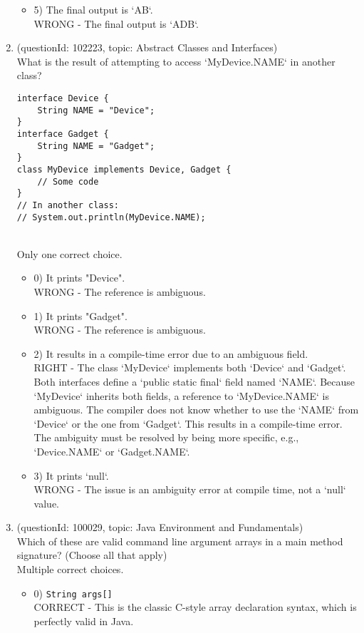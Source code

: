 \documentclass[12pt]{article}
\begin{document}
\begin{enumerate}[label=(\arabic*)]
\begin{itemize}
\item 5) The final output is `AB`.
 \\ 
WRONG - The final output is `ADB`.

\end{itemize}
\item (questionId: 102223, topic: Abstract Classes and Interfaces) \\ 
What is the result of attempting to access `MyDevice.NAME` in another class?\n\begin{verbatim}
interface Device {
    String NAME = "Device";
}
interface Gadget {
    String NAME = "Gadget";
}
class MyDevice implements Device, Gadget {
    // Some code
}
// In another class:
// System.out.println(MyDevice.NAME);
\end{verbatim}
\\ \noindent Only one correct choice. 
\begin{itemize}
\item 0) It prints "Device".
 \\ 
WRONG - The reference is ambiguous.

\item 1) It prints "Gadget".
 \\ 
WRONG - The reference is ambiguous.

\item 2) It results in a compile-time error due to an ambiguous field.
 \\ 
RIGHT - The class `MyDevice` implements both `Device` and `Gadget`. Both interfaces define a `public static final` field named `NAME`. Because `MyDevice` inherits both fields, a reference to `MyDevice.NAME` is ambiguous. The compiler does not know whether to use the `NAME` from `Device` or the one from `Gadget`. This results in a compile-time error. The ambiguity must be resolved by being more specific, e.g., `Device.NAME` or `Gadget.NAME`.

\item 3) It prints `null`.
 \\ 
WRONG - The issue is an ambiguity error at compile time, not a `null` value.

\end{itemize}
\item (questionId: 100029, topic: Java Environment and Fundamentals) \\ 
Which of these are valid command line argument arrays in a main method signature? (Choose all that apply)
\\ \noindent Multiple correct choices. 
\begin{itemize}
\item 0) \verb|String args[]|
 \\ 
CORRECT - This is the classic C-style array declaration syntax, which is perfectly valid in Java.


\end{itemize}
\end{enumerate}
\end{document}
